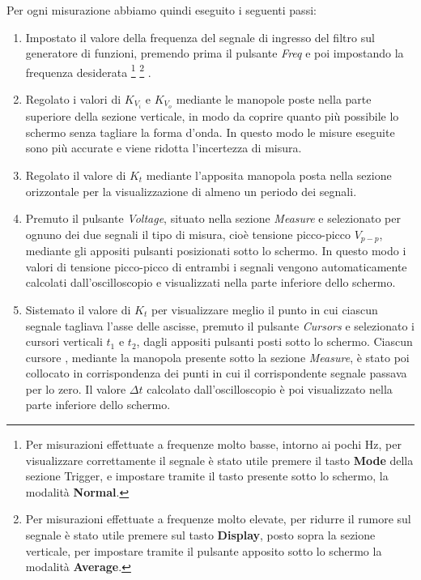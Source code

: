 Per ogni misurazione abbiamo quindi eseguito i seguenti passi:
\begin{enumerate}
    \item Impostato il valore della frequenza del segnale di ingresso del filtro  sul generatore di funzioni, premendo prima il pulsante \emph{Freq} e poi impostando la frequenza desiderata \footnote{Per misurazioni effettuate a frequenze molto basse, intorno ai pochi Hz, per visualizzare correttamente il segnale è stato utile premere il tasto \textbf{Mode} della sezione Trigger, e impostare tramite il tasto presente sotto lo schermo, la modalità \textbf{Normal}.} \footnote{Per misurazioni effettuate a frequenze molto elevate, per ridurre il rumore sul segnale è stato utile premere sul tasto \textbf{Display}, posto sopra la sezione verticale, per impostare tramite il pulsante apposito sotto lo schermo la modalità \textbf{Average}.} .
    \item Regolato i valori di $K_{V_i}$ e $K_{V_o}$ mediante le manopole poste nella parte superiore della sezione verticale, in modo da coprire quanto più possibile lo schermo senza tagliare la forma d'onda. In questo modo le misure eseguite sono più accurate e viene ridotta l'incertezza di misura.
    \item Regolato il valore di $K_t$ mediante l'apposita manopola posta nella sezione orizzontale per la visualizzazione di almeno un periodo dei segnali.
    \item Premuto il pulsante \emph{Voltage}, situato nella sezione \emph{Measure} e selezionato per ognuno dei due segnali il tipo di misura, cioè tensione picco-picco $V_{p-p}$, mediante gli appositi pulsanti posizionati sotto lo schermo.
    In questo modo i valori di tensione picco-picco di entrambi i segnali vengono automaticamente calcolati dall'oscilloscopio e visualizzati nella parte inferiore dello schermo.
    \item Sistemato il valore di $K_t$ per visualizzare meglio il punto in cui ciascun segnale tagliava l'asse delle ascisse, premuto il pulsante \emph{Cursors} e selezionato i cursori verticali $t_1$ e $t_2$, dagli appositi pulsanti posti sotto lo schermo. Ciascun cursore , mediante la manopola presente sotto la sezione \emph{Measure}, è stato poi collocato in corrispondenza dei punti in cui il corrispondente segnale passava per lo zero. Il valore $\Delta t$  calcolato dall'oscilloscopio è poi visualizzato nella parte inferiore dello schermo. 
    
\end{enumerate}




